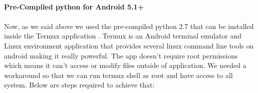 \documentclass[../main.tex]{subfile}
\begin{document}
		\paragraph{Pre-Compiled python for Android 5.1+}
		\paragraph{} Now, as we said above we used the pre-compiled python 2.7 that can be installed inside the Termux application \cite{termux_website}. Termux is an Android terminal emulator and Linux environment application that provides several linux command line tools on android making it really powerful. The app doesn't require root permissions which means it can't access or modify files outside of application. We needed a workaround so that we can run termux shell as root and have access to all system. Below are steps required to achieve that:	
				
\end{document}
